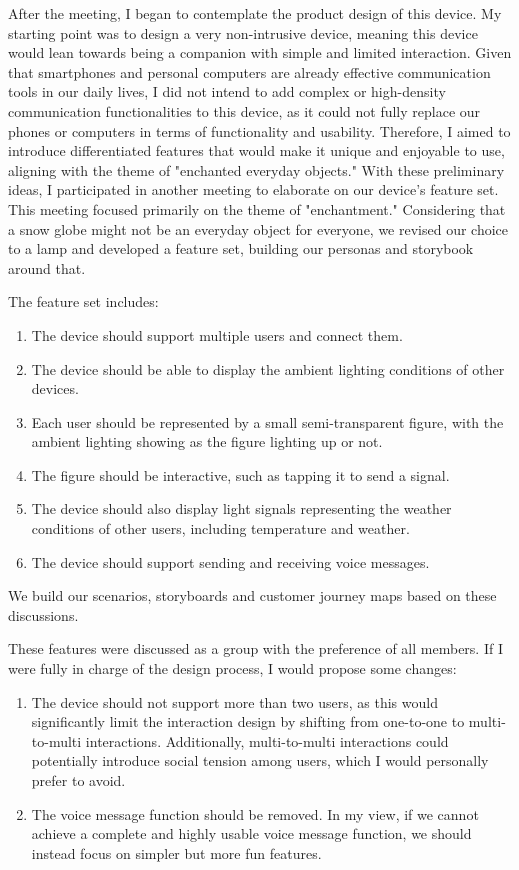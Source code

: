 After the meeting, I began to contemplate the product design of this device. My starting point was to design a very non-intrusive device, meaning this device would lean towards being a companion with simple and limited interaction. Given that smartphones and personal computers are already effective communication tools in our daily lives, I did not intend to add complex or high-density communication functionalities to this device, as it could not fully replace our phones or computers in terms of functionality and usability. Therefore, I aimed to introduce differentiated features that would make it unique and enjoyable to use, aligning with the theme of "enchanted everyday objects." With these preliminary ideas, I participated in another meeting to elaborate on our device's feature set. This meeting focused primarily on the theme of "enchantment." Considering that a snow globe might not be an everyday object for everyone, we revised our choice to a lamp and developed a feature set, building our personas and storybook around that.

The feature set includes:
\begin{enumerate}
    \item The device should support multiple users and connect them.
    \item The device should be able to display the ambient lighting conditions of other devices.
    \item Each user should be represented by a small semi-transparent figure, with the ambient lighting showing as the figure lighting up or not.
    \item The figure should be interactive, such as tapping it to send a signal.
    \item The device should also display light signals representing the weather conditions of other users, including temperature and weather.
    \item The device should support sending and receiving voice messages.
\end{enumerate}

We build our scenarios, storyboards and customer journey maps based on these discussions.

These features were discussed as a group with the preference of all members. If I were fully in charge of the design process, I would propose some changes:

\begin{enumerate}
    \item The device should not support more than two users, as this would significantly limit the interaction design by shifting from one-to-one to multi-to-multi interactions. Additionally, multi-to-multi interactions could potentially introduce social tension among users, which I would personally prefer to avoid.
    \item The voice message function should be removed. In my view, if we cannot achieve a complete and highly usable voice message function, we should instead focus on simpler but more fun features.
\end{enumerate}

